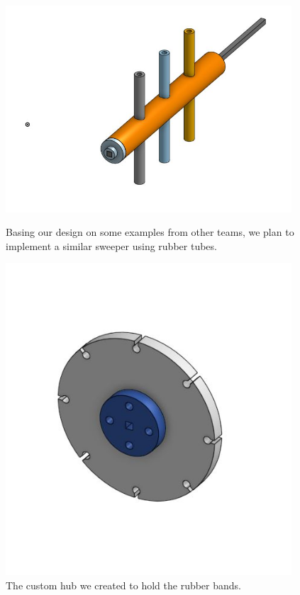 \begin{figure}[ht]
\centering
\begin{minipage}[b]{.48\textwidth}
  \centering
  \includegraphics[width=0.95\textwidth]{Meetings/August/08-20-21/8-18-21_CAD_Image7 - Nathan Forrer.jpg}
  \caption{Basing our design on some examples from other teams, we plan to implement a similar sweeper using rubber tubes.}
  \label{fig:082021_7}
\end{minipage}%
\hfill%
\begin{minipage}[b]{.48\textwidth}
  \centering
  \includegraphics[width=0.95\textwidth]{Meetings/August/08-20-21/8-18-21_CAD_Image8 - Nathan Forrer.jpg}
  \caption{The custom hub we created to hold the rubber bands.}
  \label{fig:082021_8}
\end{minipage}
\end{figure}


